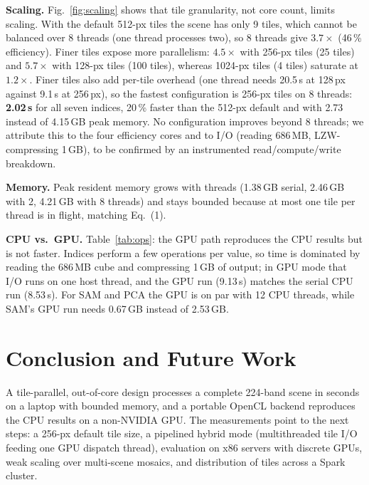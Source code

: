 \documentclass[conference]{IEEEtran}
\begin{document}
\textbf{Scaling.} Fig.~\ref{fig:scaling} shows that tile granularity, not
core count, limits scaling. With the default 512-px tiles the scene has only 9
tiles, which cannot be balanced over 8 threads (one thread processes two), so
8 threads give $3.7\times$ (46\,\% efficiency). Finer tiles expose more
parallelism: $4.5\times$ with 256-px tiles (25 tiles) and $5.7\times$ with
128-px tiles (100 tiles), whereas 1024-px tiles (4 tiles) saturate at
$1.2\times$. Finer tiles also add per-tile overhead (one thread needs 20.5\,s at
128\,px against 9.1\,s at 256\,px), so the fastest configuration is 256-px
tiles on 8 threads: \textbf{2.02\,s} for all seven indices, 20\,\% faster than
the 512-px default and with 2.73 instead of 4.15\,GB peak memory. No
configuration improves beyond 8 threads; we attribute this to the four
efficiency cores and to I/O (reading 686\,MB, LZW-compressing 1\,GB), to be
confirmed by an instrumented read/compute/write breakdown.

\textbf{Memory.} Peak resident memory grows with threads (1.38\,GB serial,
2.46\,GB with 2, 4.21\,GB with 8 threads) and stays bounded because at most
one tile per thread is in flight, matching Eq.~(1).

\textbf{CPU vs.\ GPU.} Table~\ref{tab:ops}: the GPU path reproduces the CPU
results but is not faster. Indices perform a few operations per value, so
time is dominated by reading the 686\,MB cube and compressing 1\,GB of output;
in GPU mode that I/O runs on one host thread, and the GPU run (9.13\,s)
matches the serial CPU run (8.53\,s). For SAM and PCA the GPU is on par with
12 CPU threads, while SAM's GPU run needs 0.67\,GB instead of 2.53\,GB.

\section{Conclusion and Future Work}
A tile-parallel, out-of-core design processes a complete 224-band scene in
seconds on a laptop with bounded memory, and a portable OpenCL backend
reproduces the CPU results on a non-NVIDIA GPU. The measurements point to the
next steps: a 256-px default tile size, a pipelined hybrid mode (multithreaded tile I/O feeding one GPU
dispatch thread), evaluation on x86 servers with discrete GPUs, weak scaling
over multi-scene mosaics, and distribution of tiles across a Spark cluster.
\end{document}
